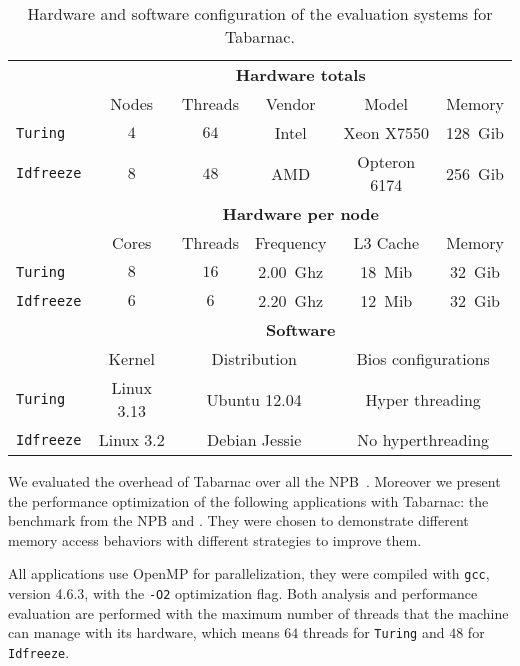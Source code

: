 \begin{table}[htb]
    \centering
    \begin{tabular}{lccccc}
        \toprule
        & \multicolumn{5}{c}{\textbf{Hardware totals}}\\
        \cmidrule(lr){2-6}
        & Nodes & Threads & Vendor & Model & Memory \\
        \cmidrule(lr){2-6}
        \texttt{Turing}   & $4$ & $64$ & Intel & Xeon X7550   & \SI{128}{Gib} \\
        \texttt{Idfreeze} & $8$ & $48$ & AMD   & Opteron 6174 & \SI{256}{Gib}\\
        \midrule
        & \multicolumn{5}{c}{\textbf{Hardware per node}}\\
        \cmidrule(lr){2-6}
        & Cores & Threads & Frequency & L3 Cache & Memory \\
        \cmidrule(lr){2-6}
        \texttt{Turing}   & $8$ & $16$ & \SI{2.00}{Ghz}& \SI{18}{Mib} & \SI{32}{Gib} \\
        \texttt{Idfreeze} & $6$ & $6$  & \SI{2.20}{Ghz}& \SI{12}{Mib} & \SI{32}{Gib}\\
        \midrule
        & \multicolumn{5}{c}{\textbf{Software}}\\
        \cmidrule(lr){2-6}
        & Kernel & \multicolumn{2}{c}{Distribution} &
            \multicolumn{2}{c}{Bios configurations} \\
        \cmidrule(lr){2-6}
        \texttt{Turing}   & Linux 3.13 & \multicolumn{2}{c}{Ubuntu 12.04} &
            \multicolumn{2}{c}{Hyper threading} \\
        \texttt{Idfreeze} & Linux 3.2 & \multicolumn{2}{c}{Debian Jessie} &
            \multicolumn{2}{c}{No hyperthreading}\\
        \bottomrule
    \end{tabular}
    \caption{Hardware and software configuration of the evaluation systems for Tabarnac.}
    \label{tab:turing-hw}
\end{table}

We evaluated the overhead of \gls{Tabarnac} over all the \gls{NPB}~\cite{Jin99NPBOpenMP}.
Moreover we present the performance optimization of the following applications with \gls{Tabarnac}: the \IS benchmark from the \gls{NPB} and \Ondes.
They were chosen to demonstrate different memory access behaviors with different strategies to improve them.

All applications use OpenMP for parallelization, they were compiled with \texttt{gcc}, version 4.6.3, with the \texttt{-O2} optimization flag.
Both analysis and performance evaluation are performed with the maximum number of threads that the machine can manage with its hardware, which means $64$ threads for \texttt{Turing} and $48$ for \texttt{Idfreeze}.


